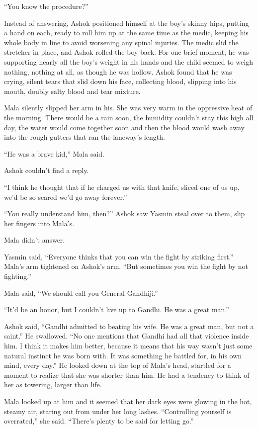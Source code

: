 ``You know the procedure?''

Instead of answering, Ashok positioned himself at the boy's skinny
hips, putting a hand on each, ready to roll him up at the same time
as the medic, keeping his whole body in line to avoid worsening any
spinal injuries. The medic slid the stretcher in place, and Ashok
rolled the boy back. For one brief moment, he was supporting nearly
all the boy's weight in his hands and the child seemed to weigh
nothing, nothing at all, as though he was hollow. Ashok found that
he was crying, silent tears that slid down his face, collecting
blood, slipping into his mouth, doubly salty blood and tear
mixture.

Mala silently slipped her arm in his. She was very warm in the
oppressive heat of the morning. There would be a rain soon, the
humidity couldn't stay this high all day, the water would come
together soon and then the blood would wash away into the rough
gutters that ran the laneway's length.

``He was a brave kid,'' Mala said.

Ashok couldn't find a reply.

``I think he thought that if he charged us with that knife, sliced
one of us up, we'd be so scared we'd go away forever.''

``You really understand him, then?'' Ashok saw Yasmin steal over to
them, slip her fingers into Mala's.

Mala didn't answer.

Yasmin said, ``Everyone thinks that you can win the fight by
striking first.'' Mala's arm tightened on Ashok's arm. ``But
sometimes you win the fight by not fighting.''

Mala said, ``We should call you General Gandhiji.''

``It'd be an honor, but I couldn't live up to Gandhi. He was a great
man.''

Ashok said, ``Gandhi admitted to beating his wife. He was a great
man, but not a saint.'' He swallowed. ``No one mentions that Gandhi
had all that violence inside him. I think it makes him better,
because it means that his way wasn't just some natural instinct he
was born with. It was something he battled for, in his own mind,
every day.'' He looked down at the top of Mala's head, startled for
a moment to realize that she was shorter than him. He had a
tendency to think of her as towering, larger than life.

Mala looked up at him and it seemed that her dark eyes were glowing
in the hot, steamy air, staring out from under her long lashes.
``Controlling yourself is overrated,'' she said. ``There's plenty to
be said for letting go.''

